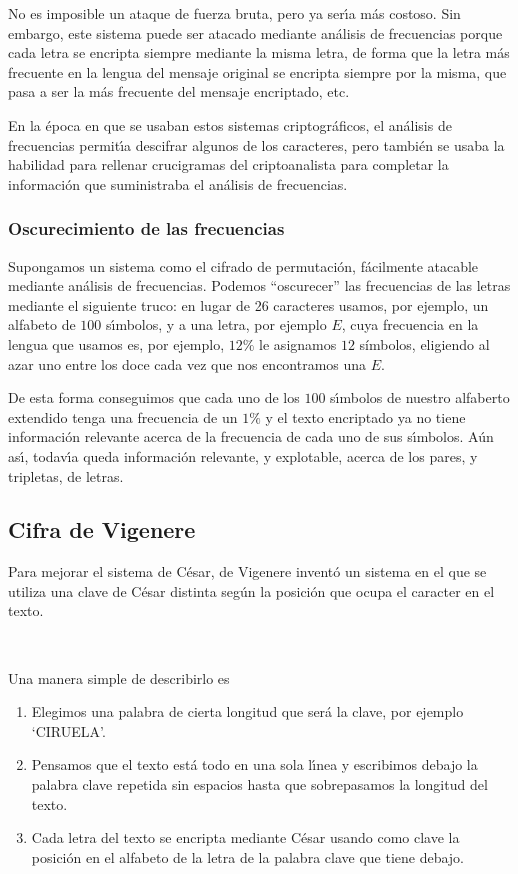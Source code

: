 No es imposible un ataque de fuerza bruta, pero
ya ser\'{\i}a m\'as costoso. Sin embargo, este sistema puede ser atacado
mediante an\'alisis de frecuencias porque cada letra se encripta siempre
mediante la misma letra, de forma que la letra m\'as frecuente en la lengua del
mensaje original se encripta siempre por la misma, que pasa a ser la m\'as
frecuente del mensaje encriptado, etc.  


En la \'epoca en que se usaban estos sistemas criptogr\'aficos, el an\'alisis de
frecuencias permit\'{\i}a descifrar algunos de los caracteres, pero tambi\'en se
usaba la habilidad para rellenar crucigramas del criptoanalista para completar
la informaci\'on  que suministraba el an\'alisis de frecuencias.
 
 
 \subsubsection{Oscurecimiento de las frecuencias}\label{oscurecer}
 Supongamos un sistema como el cifrado de permutaci\'on, f\'acilmente atacable
mediante an\'alisis de frecuencias. Podemos ``oscurecer'' las frecuencias de las
letras mediante el siguiente truco: en lugar de 26 caracteres usamos, por
ejemplo, un alfabeto de  $100$ s\'{\i}mbolos, y a una letra, por ejemplo $E$, 
cuya frecuencia en la lengua que usamos es, por ejemplo, $12\%$ le asignamos
$12$ s\'imbolos, eligiendo al azar uno entre los doce cada vez que nos
encontramos  una $E$. 

De esta forma conseguimos que cada uno de los $100$
s\'{\i}mbolos de nuestro alfaberto extendido tenga una frecuencia de un $1\%$ y
el texto encriptado ya no tiene informaci\'on relevante acerca de la frecuencia
de cada uno de sus s\'{\i}mbolos. A\'un as\'{\i}, todav\'{\i}a queda
informaci\'on relevante, y explotable,  acerca de los pares, y tripletas, de
letras.
 
\subsection{Cifra de Vigenere}
 
 Para mejorar el sistema de C\'esar, de Vigenere  invent\'o un sistema en el que
se utiliza una clave de C\'esar distinta seg\'un la posici\'on que ocupa el
caracter en el texto. 

\

Una manera simple de describirlo es 
\begin{enumerate}
\item Elegimos una palabra de cierta longitud que ser\'a la clave, por ejemplo
`CIRUELA'.
\item Pensamos que el texto est\'a todo en una sola l\'{\i}nea y escribimos
debajo la palabra clave repetida sin espacios  hasta que sobrepasamos la
longitud del texto.



\item Cada letra  del texto se encripta mediante C\'esar usando 
como clave  la posici\'on en el alfabeto de la letra de la palabra clave que 
tiene debajo.

\end{enumerate}
 
